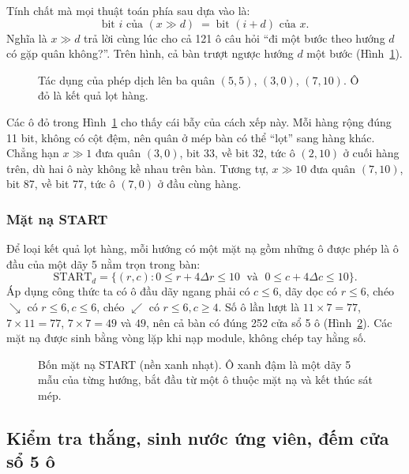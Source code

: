 Tính chất mà mọi thuật toán phía sau dựa vào là:
\begin{equation}
  \text{bit } i \text{ của } (x \gg d) \;=\; \text{bit } (i + d) \text{ của } x.
  \label{eq:dich}
\end{equation}
Nghĩa là $x \gg d$ trả lời cùng lúc cho cả 121 ô câu hỏi ``đi một bước theo hướng $d$ có gặp quân không?''. Trên hình, cả bàn trượt ngược hướng $d$ một bước (Hình~\ref{fig:dich-bit}).

\begin{figure}[H]
  \centering
  
  \caption{Tác dụng của phép dịch lên ba quân $(5,5)$, $(3,0)$, $(7,10)$. Ô đỏ là kết quả lọt hàng.}
  \label{fig:dich-bit}
\end{figure}

Các ô đỏ trong Hình~\ref{fig:dich-bit} cho thấy cái bẫy của cách xếp này. Mỗi hàng rộng đúng 11 bit, không có cột đệm, nên quân ở mép bàn có thể ``lọt'' sang hàng khác. Chẳng hạn $x \gg 1$ đưa quân $(3, 0)$, bit 33, về bit 32, tức ô $(2, 10)$ ở cuối hàng trên, dù hai ô này không kề nhau trên bàn. Tương tự, $x \gg 10$ đưa quân $(7, 10)$, bit 87, về bit 77, tức ô $(7, 0)$ ở đầu cùng hàng.

\subsubsection{Mặt nạ START}
Để loại kết quả lọt hàng, mỗi hướng có một mặt nạ gồm những ô được phép là ô đầu của một dãy 5 nằm trọn trong bàn:
\begin{equation}
  \mathrm{START}_d = \{(r, c) : 0 \le r + 4\Delta r \le 10 \;\text{ và }\; 0 \le c + 4\Delta c \le 10\}.
  \label{eq:start}
\end{equation}
Áp dụng công thức ta có ô đầu dãy ngang phải có $c \le 6$, dãy dọc có $r \le 6$, chéo $\searrow$ có $r \le 6, c \le 6$, chéo $\swarrow$ có $r \le 6, c \ge 4$. Số ô lần lượt là $11 \times 7 = 77$, $7 \times 11 = 77$, $7 \times 7 = 49$ và $49$, nên cả bàn có đúng 252 cửa sổ 5 ô (Hình~\ref{fig:start}). Các mặt nạ được sinh bằng vòng lặp khi nạp module, không chép tay hằng số.

\begin{figure}[H]
  \centering
  
  \caption{Bốn mặt nạ START (nền xanh nhạt). Ô xanh đậm là một dãy 5 mẫu của từng hướng, bắt đầu từ một ô thuộc mặt nạ và kết thúc sát mép.}
  \label{fig:start}
\end{figure}

\subsection{Kiểm tra thắng, sinh nước ứng viên, đếm cửa sổ 5 ô}
\label{sec:bb-thuat-toan}

